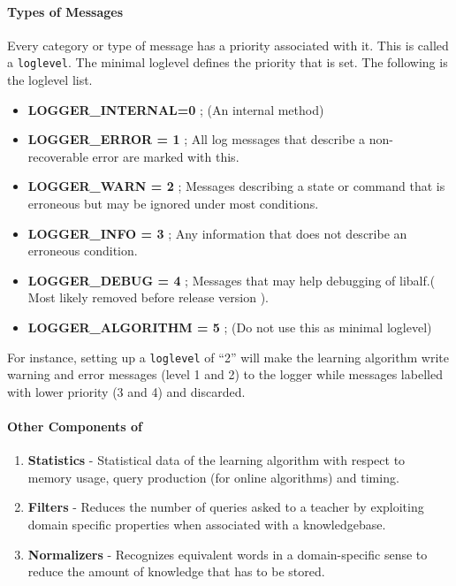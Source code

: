 \paragraph{Types of Messages}
Every category or type of message has a priority associated with it. This is called a \texttt{loglevel}. The minimal loglevel defines the priority that is set. The following is the loglevel list. 
\begin{itemize}
 \item \textbf{LOGGER\_INTERNAL=0} ; (An internal method)
 \item \textbf{LOGGER\_ERROR = 1} ; All log messages that describe a non-recoverable error are marked with this.
 \item \textbf{LOGGER\_WARN = 2} ; Messages describing a state or command that is erroneous but may be ignored under most conditions.
 \item \textbf{LOGGER\_INFO = 3} ; Any information that does not describe an erroneous condition.
 \item \textbf{LOGGER\_DEBUG = 4} ; Messages that may help debugging of libalf.( Most likely removed before release version ).
 \item \textbf{LOGGER\_ALGORITHM = 5} ; (Do not use this as minimal loglevel)
\end{itemize}
For instance, setting up a \texttt{loglevel} of ``2'' will make the learning algorithm write warning and error messages (level 1 and 2) to the logger while messages labelled with lower priority (3 and 4) and discarded.

\paragraph{Other Components of \libalf}
\begin{enumerate}
 \item \textbf{Statistics} - Statistical data of the learning algorithm with respect to memory usage, query production (for online algorithms) and timing.
 \item \textbf{Filters} - Reduces the number of queries asked to a teacher by exploiting domain specific properties when associated with a knowledgebase.
 \item \textbf{Normalizers} - Recognizes equivalent words in a domain-specific sense to reduce the amount of knowledge that has to be stored.
\end{enumerate}

